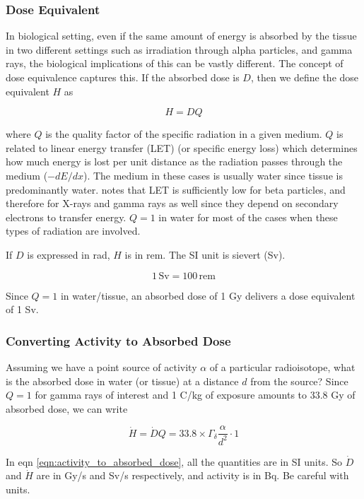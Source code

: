 \documentclass{article}
\begin{document}
\subsubsection{Dose Equivalent}

In biological setting, even if the same amount of energy is absorbed by the tissue in two different settings such as irradiation through alpha particles, and gamma rays, the biological 
implications of this can be vastly different. The concept of dose equivalence captures this. If the absorbed dose is $D$, then we define the dose equivalent $H$ as 

\[H = DQ\]

where $Q$ is the quality factor of the specific radiation in a given medium. $Q$ is related to linear energy transfer (LET) (or specific energy loss) which determines how much energy is lost 
per unit distance as the radiation passes through the medium ($-dE/dx$). The medium in these cases is usually water since tissue is predominantly water. 
\cite{Knoll2000} notes that LET is sufficiently low for beta particles, and therefore for X-rays and gamma rays as well since they depend on secondary electrons to transfer energy. $Q=1$ in water for 
most of the cases when these types of radiation are involved. 

If $D$ is expressed in rad, $H$ is in rem. The SI unit is sievert (Sv). 

\[1 \, \text{Sv} = 100 \, \text{rem}\]

Since $Q=1$ in water/tissue, an absorbed dose of 1 Gy delivers a dose equivalent of 1 Sv.

\subsubsection{Converting Activity to Absorbed Dose}

Assuming we have a point source of activity $\alpha$ of a particular radioisotope, what is the absorbed dose in water (or tissue) at a distance $d$ from the source?
Since $Q=1$ for gamma rays of interest and 1 C/kg of exposure amounts to 33.8 Gy of absorbed dose, we can write 

\begin{equation}\label{eqn:activity_to_absorbed_dose}
    \dot{H} = \dot{D} Q = 33.8 \times \Gamma_{\delta} \frac{\alpha}{d^2} \cdot 1
\end{equation}

In eqn \ref{eqn:activity_to_absorbed_dose}, all the quantities are in SI units. So $\dot{D}$ and $\dot{H}$ are in Gy/s and Sv/s respectively, and activity is in Bq. Be careful with units.
\end{document}
